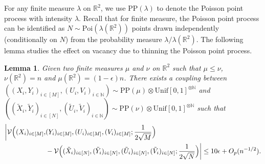 \documentclass[11pt]{article}
\newtheorem{lemma}[thm]{Lemma}
\begin{document}
For any finite measure $\lambda$ on $\mathbb{R}^2$, we use $\mathrm{PP}(\lambda)$ to denote the Poisson point process with intensity $\lambda$. Recall that for finite measure, the Poisson point process can be identified as $N\sim \mathrm{Poi}(\lambda(\mathbb{R}^2))$ points drawn independently (conditionally on $N$) from the probability measure $\lambda / \lambda(\mathbb{R}^2)$. The following lemma studies the effect on vacancy due to thinning the Poisson point process.

\begin{lemma}
    \label{Lemma:Thinning} Given two finite measures $\mu$ and $\nu$ on $\mathbb{R}^2$ such that $\mu\leq \nu$, $\nu(\mathbb{R}^2)=n$ and $\mu(\mathbb{R}^2)=(1-\epsilon)n$. There
    exists a coupling between $((X_i,Y_i)_{i\in[M]}, (U_i,V_i)_{i\in\mathbb{N}}) \sim \mathrm{PP}(\mu)\otimes \mathrm{Unif}[0,1]^{\otimes\mathbb{N}}$ and $((\tilde X_i,\tilde Y_i)_{i\in[N]}, (\tilde U_i,\tilde V_i)_{i\in\mathbb{N}}) \sim \mathrm{PP}(\nu)\otimes \mathrm{Unif}[0,1]^{\otimes\mathbb{N}}$ such that 
    \begin{align*}
    \biggl|\mathcal{V}\Bigl((X_i)_{i\in[M]}, &(Y_i)_{i\in[M]}, (U_i)_{i\in[M]}, (V_i)_{i\in[M]}; \frac{1}{2\sqrt{M}}\Bigr) \\
    & - \mathcal{V}\Bigl((\tilde X_i)_{i\in[N]}, (\tilde Y_i)_{i\in[N]}, (\tilde U_i)_{i\in[N]}, (\tilde V_i)_{i\in[N]}; \frac{1}{2\sqrt{N}}\Bigr)\biggr| \leq 10\epsilon + O_p(n^{-1/2}).
    \end{align*}
\end{lemma}
\end{document}
